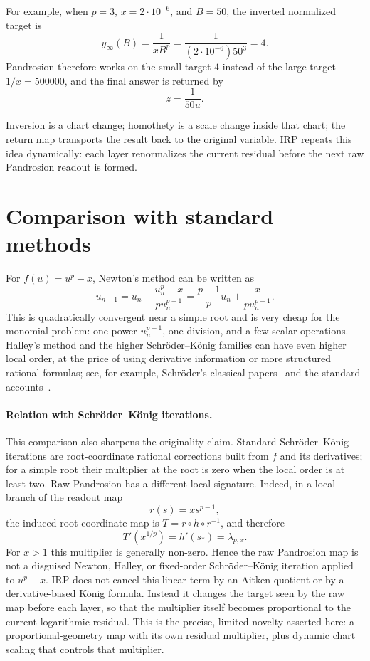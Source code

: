 \documentclass[10pt,a4paper]{article}
\theoremstyle{plain}
\theoremstyle{definition}
\theoremstyle{remark}
\newenvironment{takeaway}{%
  \begin{center}\begin{minipage}{0.92\linewidth}\small\itshape\color{blue!45!black}%
}{%
  \end{minipage}\end{center}%
}
\begin{document}
For example, when
$p=3$, $x=2\cdot10^{-6}$, and $B=50$, the inverted normalized target is
\[
  y_\infty(B)=\frac{1}{xB^p}
  =\frac{1}{(2\cdot10^{-6})50^3}=4.
\]
Pandrosion therefore works on the small target $4$ instead of the large target
$1/x=500000$, and the final answer is returned by
\[
  z=\frac{1}{50u}.
\]

\begin{takeaway}
Inversion is a chart change; homothety is a scale change inside that chart; the
return map transports the result back to the original variable.  IRP repeats
this idea dynamically: each layer renormalizes the current residual before the
next raw Pandrosion readout is formed.
\end{takeaway}

\section{Comparison with standard methods}
\label{sec:comparison}

For $f(u)=u^p-x$, Newton's method can be written as
\begin{equation}
  u_{n+1}
  =u_n-\frac{u_n^p-x}{p u_n^{p-1}}
  =\frac{p-1}{p}u_n+\frac{x}{p u_n^{p-1}}.
  \label{eq:newton-monomial}
\end{equation}
This is quadratically convergent near a simple root and is very cheap for the
monomial problem: one power $u_n^{p-1}$, one division, and a few scalar
operations.  Halley's method and the higher Schröder--König families can have
even higher local order, at the price of using derivative information or more
structured rational formulas; see, for example, Schröder's classical papers~\cite{schroder1870,schroder1871} and the standard accounts~\cite{traub,householder}.

\paragraph{Relation with Schröder--König iterations.}
This comparison also sharpens the originality claim.  Standard Schröder--König
iterations are root-coordinate rational corrections built from $f$ and its
derivatives; for a simple root their multiplier at the root is zero when the
local order is at least two.  Raw Pandrosion has a different local signature.
Indeed, in a local branch of the readout map
\[
  r(s)=x s^{p-1},
\]
the induced root-coordinate map is $T=r\circ h\circ r^{-1}$, and therefore
\[
  T'(x^{1/p})=h'(s_*)=\lambda_{p,x}.
\]
For $x>1$ this multiplier is generally non-zero.  Hence the raw Pandrosion map
is not a disguised Newton, Halley, or fixed-order Schröder--König iteration
applied to $u^p-x$.  IRP does not cancel this linear term by an Aitken quotient or by a derivative-based
König formula.  Instead it changes the target seen by the raw map before each
layer, so that the multiplier itself becomes proportional to the current
logarithmic residual.  This is the precise, limited novelty asserted here: a
proportional-geometry map with its own residual multiplier, plus dynamic chart
scaling that controls that multiplier.
\end{document}
